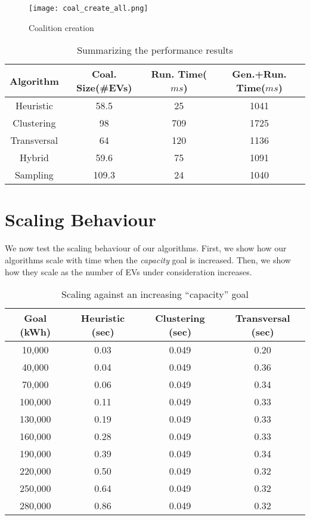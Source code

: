 \begin{figure}		
	\centering
	\texttt{[image: coal\_create\_all.png]}
	\caption{Coalition creation\label{fig:coal_create_all}}
\end{figure}

\begin{table}
	\begin{center}
		\begin{tabular}{| c || c | c | c | }
			\hline
			Algorithm  	& Coal. Size(\#EVs) & Run. Time($ms$) & Gen.+Run. Time($ms$)\\ \hline
			Heuristic	& 58.5 & 25 & 1041\\ \hline
			Clustering 	& 98 & 709 & 1725\\ \hline
			Transversal &  64 & 120  & 1136 \\ \hline
			Hybrid &  59.6 & 75  & 1091\\ \hline
			Sampling &  109.3 & 24  & 1040\\ \hline
		
		\end{tabular}
	\end{center}
	
	\caption{Summarizing the performance results\label{tab:resultssum}}
\end{table}	

\section{Scaling Behaviour}
We now test the scaling behaviour of our algorithms. First, we show how our algorithms scale with time when the \textit{capacity} goal is increased. Then, we show how they scale as the number of EVs  under consideration increases.

	\begin{table}
		\begin{center}
			\begin{tabular}{| c || c | c | c | }
				\hline
				Goal (kWh)& Heuristic (sec) & Clustering (sec) & Transversal (sec) \\ \hline
				10,000  & 0.03& 0.049 & 0.20\\ \hline
				40,000  & 0.04 & 0.049 & 0.36  \\ \hline
				70,000  & 0.06 & 0.049 & 0.34  \\ \hline
				100,000 & 0.11 & 0.049 & 0.33 \\ \hline
				130,000 & 0.19 & 0.049 & 0.33  \\ \hline
				160,000 & 0.28 & 0.049 & 0.33  \\ \hline
				190,000 & 0.39 & 0.049 & 0.34  \\ \hline
				220,000 & 0.50 & 0.049 & 0.32  \\ \hline
				250,000 & 0.64 & 0.049 & 0.32  \\ \hline
				280,000 & 0.86 & 0.049 & 0.32  \\ \hline
			\end{tabular}
		\end{center}
		\caption{Scaling against an increasing ``capacity'' goal\label{tab:goalscale}}
	\end{table}

